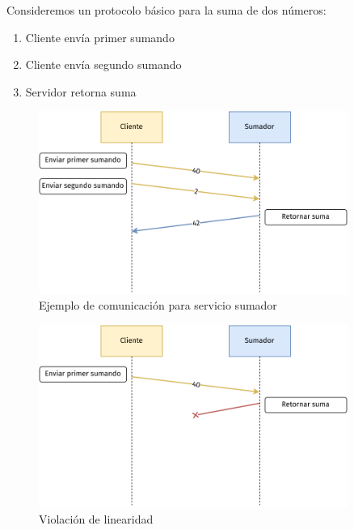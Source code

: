 \begin{frame}{\insertsubsection}
	Consideremos un protocolo básico para la suma de dos números:
	\begin{enumerate}
		\item Cliente envía primer sumando
		\item Cliente envía segundo sumando
		\item Servidor retorna suma
	\end{enumerate}
\end{frame}

\begin{frame}{\insertsubsection}
	\begin{figure}
		\centering
		\includegraphics[width=0.9\textwidth]{images/sum-diagram.pdf}
		\caption{Ejemplo de comunicación para servicio sumador}
	\end{figure}
\end{frame}

\begin{frame}{\insertsubsection}
	\begin{figure}
		\centering
		\includegraphics[width=0.9\textwidth]{images/sum-diagram-illegal.pdf}
		\caption{Violación de linearidad}
	\end{figure}
\end{frame}

